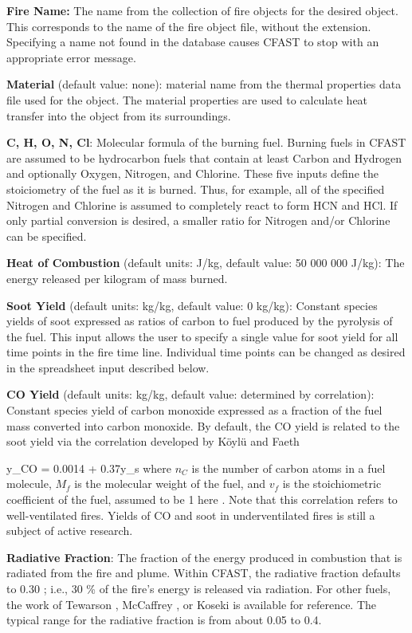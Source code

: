 \textbf{Fire Name:} The name from the collection of fire objects for the desired object.  This corresponds to the name of the fire object file, without the extension. Specifying a name not found in the database causes CFAST to stop with an appropriate error message.

\textbf{Material} (default value: none): material name from the thermal properties data file used for the object. The material properties are used to calculate heat transfer into the object from its surroundings.

\textbf{C, H, O, N, Cl}: Molecular formula of the burning fuel. Burning fuels in CFAST are assumed to be hydrocarbon fuels that contain at least Carbon and Hydrogen and optionally Oxygen, Nitrogen, and Chlorine. These five inputs define the stoiciometry of the fuel as it is burned.  Thus, for example, all of the specified Nitrogen and Chlorine is assumed to completely react to form HCN and HCl.  If only partial conversion is desired, a smaller ratio for Nitrogen and/or Chlorine can be specified.

\textbf{Heat of Combustion} (default units: J/kg, default value: 50 000 000 J/kg): The energy released per kilogram of mass burned.

\textbf{Soot Yield} (default units: kg/kg, default value: 0 kg/kg): Constant species yields of soot expressed as ratios of carbon to fuel produced by the pyrolysis of the fuel. This input allows the user to specify a single value for soot yield for all time points in the fire time line. Individual time points can be changed as desired in the spreadsheet input described below.

\textbf{CO Yield} (default units: kg/kg, default value: determined by correlation): Constant species yield of carbon monoxide expressed as a fraction of the fuel mass converted into carbon monoxide.  By default, the CO yield is related to the soot yield via the correlation developed by K\"oyl\"u and Faeth

\be
y_{CO} = 0.0014 + 0.37y_s \label{eq:Koylu} \ee
where $n_C$ is the number of carbon atoms in a fuel molecule, $M_f$ is the molecular weight of the fuel, and $v_f$ is the stoichiometric coefficient of the fuel, assumed to be 1 here \cite{Koylu:1991}. Note that this correlation refers to well-ventilated fires. Yields of CO and soot in underventilated fires is still a subject of active research.

\textbf{Radiative Fraction}: The fraction of the energy produced in combustion that is radiated from the fire and plume. Within CFAST, the radiative fraction defaults to 0.30 ; i.e., 30 \% of the fire’s energy is released via radiation.  For other fuels, the work of Tewarson \cite{Tewarson:2003}, McCaffrey \cite{McCaffrey:1982}, or Koseki \cite{Koseki:1989} is available for reference.  The typical range for the radiative fraction is from about 0.05 to 0.4.

